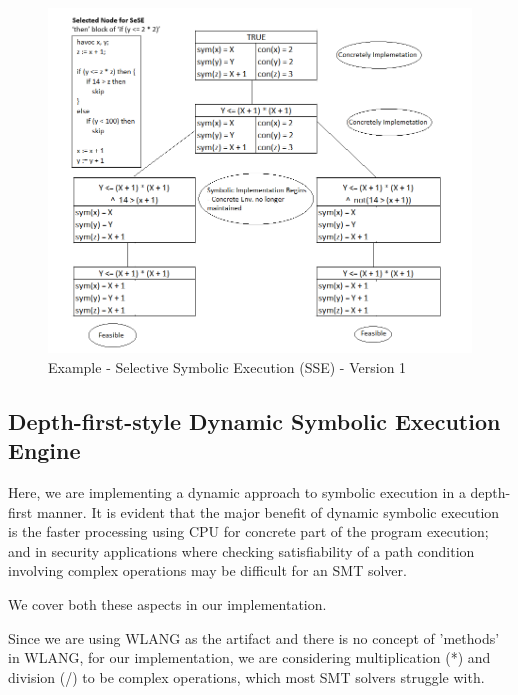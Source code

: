 \documentclass[11pt]{llncs}
\begin{document}
			\begin{figure}[H]
				\includegraphics[width=1.05\textwidth]{SeSE_Version1_Example.png}
				\caption{Example - Selective Symbolic Execution (SSE) - Version 1} \label{fig_4}
			\end{figure}
			
			\vspace{-2mm}


	\subsection{Depth-first-style Dynamic Symbolic Execution Engine} \label{Depth-first-style Dynamic Symbolic Execution Engine}
		Here, we are implementing a dynamic approach to symbolic execution in a depth-first manner.
		It is evident that the major benefit of dynamic symbolic execution is the faster processing using CPU for concrete part of the program execution; and in security applications where checking satisfiability of a path condition involving complex operations may be difficult for an SMT solver.

		\vspace{2mm}

		We cover both these aspects in our implementation.
		
		\vspace{2mm}
		
		Since we are using WLANG as the artifact and there is no concept of 'methods' in WLANG, for our implementation, we are considering multiplication (*) and division (/) to be complex operations, which most SMT solvers struggle with.
\end{document}
